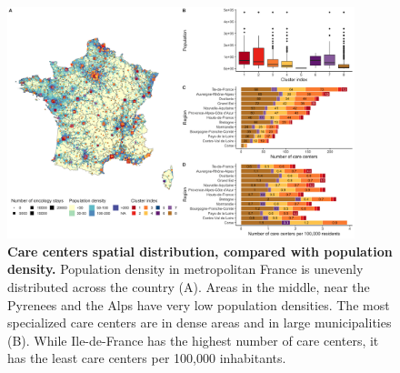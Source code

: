 \begin{figure}[H]
    \includegraphics[width=0.9\textwidth]{images/camion/supplemental/sup_fig4_care_centers_pop_density.png}
    \centering
    \caption{
        \textbf{Care centers spatial distribution, compared with population density.} Population density in metropolitan France is unevenly distributed across the country (A). Areas in the middle, near the Pyrenees and the Alps have very low population densities. The most specialized care centers are in dense areas and in large municipalities (B). While Ile-de-France has the highest number of care centers, it has the least care centers per 100,000 inhabitants.
    }
    \label{fig:clustering-map}
\end{figure}

